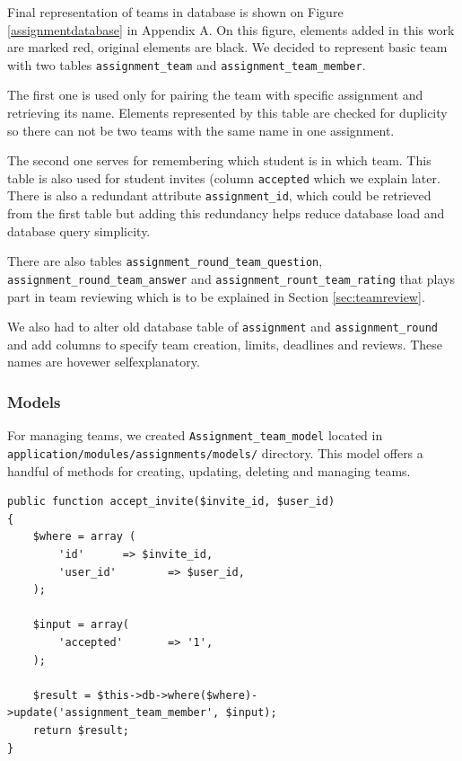 Final representation of teams in database is shown on Figure \ref{assignmentdatabase} in Appendix A. On this figure, elements added in this work are marked red, original elements are black. We decided to represent basic team with two tables \texttt{assignment\_team} and \texttt{assignment\_team\_member}.

The first one is used only for pairing the team with specific assignment and retrieving its name. Elements represented by this table are checked for duplicity so there can not be two teams with the same name in one assignment.

The second one serves for remembering which student is in which team. This table is also used for student invites (column \texttt{accepted} which we explain later. There is also a redundant attribute \texttt{assignment\_id}, which could be retrieved from the first table but adding this redundancy helps reduce database load and database query simplicity.


There are also tables \texttt{assignment\_round\_team\_question}, \texttt{assignment\_round\_team\_answer} and \texttt{assignment\_rount\_team\_rating} that plays part in team reviewing which is to be explained in Section \ref{sec:teamreview}.

We also had to alter old database table of \texttt{assignment} and \texttt{assignment\_round} and add columns to specify team creation, limits, deadlines and reviews. These names are hovewer self\-explanatory.

\subsubsection{Models}
For managing teams, we created \texttt{Assignment\_team\_model} located in \\ \texttt{application/modules/assignments/models/} directory. This model offers a handful of methods for creating, updating, deleting and managing teams.

\begin{lstlisting}[caption={Method for accepting team invites},label={lst:teaminvite}]
public function accept_invite($invite_id, $user_id)
{
    $where = array (
        'id'      => $invite_id,
        'user_id'        => $user_id,
    );

    $input = array(
        'accepted'       => '1',
    );

    $result = $this->db->where($where)->update('assignment_team_member', $input);
    return $result;
}
\end{lstlisting}

